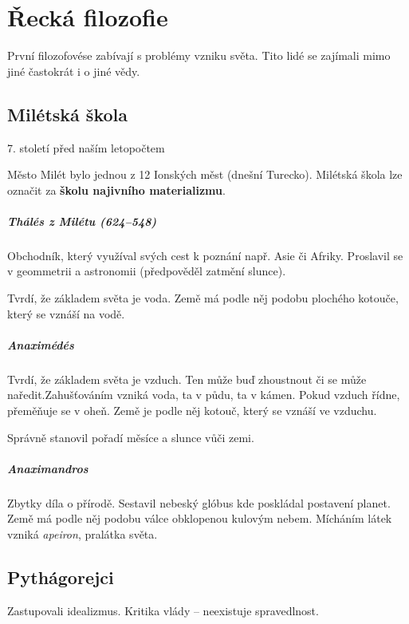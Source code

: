 \documentclass[10pt,a4paper,
twoside,%
]{report}
\begin{document}
\chapter{Řecká filozofie}

První filozofovése zabívají s problémy vzniku světa. Tito lidé se zajímali mimo jiné častokrát i o jiné vědy.



\section{Milétská škola}
7. století před naším letopočtem

Město Milét bylo jednou z 12 Ionských měst (dnešní Turecko). Milétská škola lze označit za \textbf{školu najivního materializmu}.
\paragraph{Thálés z Milétu (624--548)}
Obchodník, který využíval svých cest k poznání např. Asie či Afriky. Proslavil se v geommetrii a astronomii (předpověděl zatmění slunce).

Tvrdí, že základem světa je voda. Země má podle něj podobu plochého kotouče, který se vznáší na vodě.

\paragraph{Anaximédés} Tvrdí, že základem světa je vzduch. Ten může buď zhoustnout či se může naředit.Zahušťováním vzniká voda, ta v půdu, ta v kámen. Pokud vzduch řídne, přeměňuje se v oheň. Země je podle něj kotouč, který se vznáší ve vzduchu.

Správně stanovil pořadí měsíce a slunce vůči zemi.

\paragraph{Anaximandros} Zbytky díla o přírodě. Sestavil nebeský glóbus kde poskládal postavení planet. Země má podle něj podobu válce obklopenou kulovým nebem. Mícháním látek vzniká \emph{apeiron}, pralátka světa.




\section{Pythágorejci}

Zastupovali idealizmus. Kritika vlády -- \textsf{neexistuje spravedlnost}.
\end{document}
